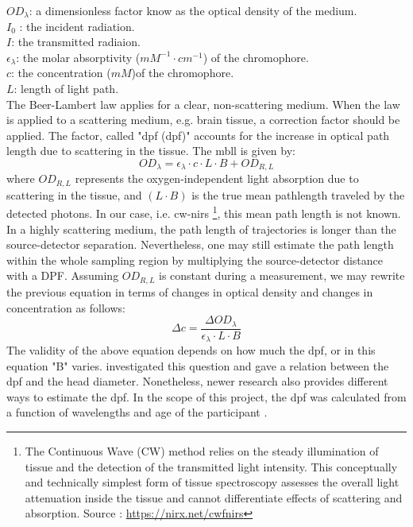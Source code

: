 \noindent 
$OD_{\lambda} $: a dimensionless factor know as the optical density of the medium.  \\
$I_0$ : the incident radiation. \\
$I$: the transmitted radiaion. \\
$\epsilon _{\lambda}$: the molar absorptivity ($mM^{-1} \cdot cm^{-1}$) of the chromophore. \\
$c$: the concentration ($mM$)of the chromophore. \\
$L$: length of light path. \\

The Beer-Lambert law applies for a clear, non-scattering medium. When the law is applied to a scattering medium, e.g. brain tissue, a correction factor should be applied. The factor, called "\acrlong{dpf} (\acrshort{dpf})" accounts for the increase in optical path length due to scattering in the tissue. The \acrlong{mbll} \cite {Delpy_1988} is given by:
\begin{equation} 
OD_{\lambda} = \epsilon _{\lambda} \cdot c \cdot L \cdot B + OD_{R,L}
\end{equation} 
where $OD_{R,L}$ represents the oxygen-independent light absorption due to scattering in the tissue, and $(L \cdot B)$ is the true mean pathlength traveled by the detected photons. In our case, i.e. \acrshort{cw-nirs} \footnote {The Continuous Wave (CW) method relies on the steady illumination of tissue and the detection of the transmitted light intensity.  This conceptually and technically simplest form of tissue spectroscopy assesses the overall  light attenuation inside the tissue and cannot differentiate effects of scattering and absorption. Source : \url{https://nirx.net/cwfnirs}}, this mean path length is not known. In a highly scattering medium, the path length of trajectories is longer than the source-detector separation. Nevertheless, one may still estimate the path length within the whole sampling region by multiplying the source-detector distance with a DPF. Assuming $OD_{R,L}$ is constant during a measurement, we may rewrite the previous equation in terms of changes in optical density and changes in concentration as follows:
\begin{equation} 
\Delta c =\frac { \Delta OD_{\lambda}} {\epsilon _{\lambda} \cdot L \cdot B}
\end{equation} 
The validity of the above equation depends on how much the \acrshort{dpf}, or in this equation "B" varies. \cite {Delpy_1988} investigated this question and gave a relation between the \acrshort{dpf} and the head diameter. Nonetheless, newer research also provides different ways to estimate the \acrshort{dpf}. In the scope of this project, the \acrshort{dpf} was calculated from a function of wavelengths and age of the participant \cite {Duncan1996MeasurementOC}.



